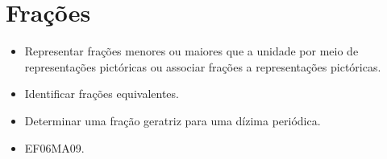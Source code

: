 \chapter{Frações}

\begin{itemize}
\item Representar frações menores ou maiores que a
unidade por meio de representações pictóricas ou associar frações a
representações pictóricas.
\item
  Identificar frações equivalentes.
\item
  Determinar uma fração geratriz para uma dízima periódica.
\end{itemize}

\begin{itemize}
\item EF06MA09.
\end{itemize}


